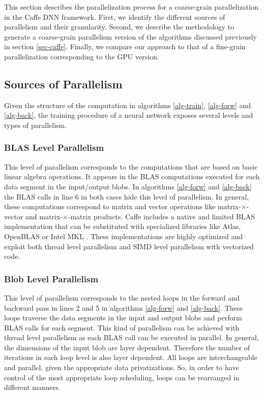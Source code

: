 This section describes the parallelization process for a coarse-grain 
parallelization in the Caffe DNN framework. First, we identify the 
different sources of parallelism and their granularity. Second, we 
describe the methodology to generate a coarse-grain parallelism version 
of the algorithms discussed previously in section \ref{sec-caffe}. Finally, 
we compare our approach to that of a fine-grain parallelization 
corresponding to the GPU version.

\subsection{Sources of Parallelism}
Given the structure of the computation in algorithms \ref{alg-train}, 
\ref{alg-forw} and \ref{alg-back}, the training procedure of a neural 
network exposes several levels and types of parallelism.

\subsubsection{BLAS Level Parallelism}
This level of parallelism corresponds to the computations that 
are based on basic linear algebra operations. It appears in the 
BLAS computations executed for each data segment in the input/output blobs.
In algorithms \ref{alg-forw} and \ref{alg-back} the BLAS calls in line 
6 in both cases hide this level of parallelism.
In general, these computations correspond to matrix and
vector operations like matrix-$\times$-vector and matrix-$\times$-matrix
products. Caffe includes a native and limited BLAS implementation that 
can be substituted with specialized libraries like Atlas, OpenBLAS  or Intel MKL \cite{blackford2002updated,dongarra2002preface}. These implementations are highly optimized and exploit both thread level parallelism and SIMD level parallelism with vectorized code.

\subsubsection{Blob Level Parallelism}
This level of parallelism corresponds to the nested loops in the forward
and backward pass in lines 2 and 5 in algorithms 
\ref{alg-forw} and \ref{alg-back}. 
These loops traverse the data segments in the input and output blobs and
perform BLAS calls for each segment. This kind of parallelism can be
achieved with thread level parallelism as each BLAS call can be
executed in parallel.
In general, the dimensions of the input blob are layer dependent. Therefore the number of iterations in each loop level is also layer dependent. All loops are 
interchangeable and parallel, given the appropriate data privatizations. 
So, in order to have control of the most appropriate loop scheduling, 
loops can be rearranged in different manners. 

